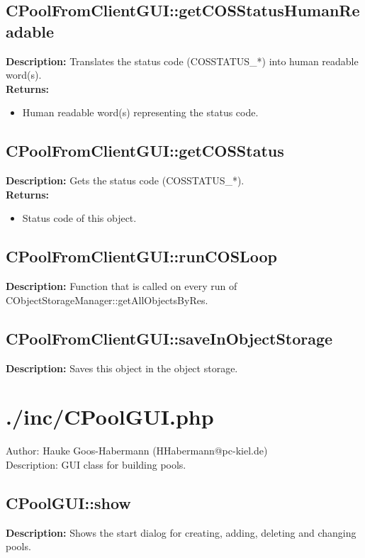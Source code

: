 \subsection{CPoolFromClientGUI::getCOSStatusHumanReadable}
\textbf{Description:} Translates the status code (COSSTATUS\_*) into human readable word(s).\\
\textbf{Returns:}
\begin{itemize}
\item Human readable word(s) representing the status code.
\end{itemize}

\subsection{CPoolFromClientGUI::getCOSStatus}
\textbf{Description:} Gets the status code (COSSTATUS\_*).\\
\textbf{Returns:}
\begin{itemize}
\item Status code of this object.
\end{itemize}

\subsection{CPoolFromClientGUI::runCOSLoop}
\textbf{Description:} Function that is called on every run of CObjectStorageManager::getAllObjectsByRes.\\

\subsection{CPoolFromClientGUI::saveInObjectStorage}
\textbf{Description:} Saves this object in the object storage.\\

\newpage\section{./inc/CPoolGUI.php}
 Author: Hauke Goos-Habermann (HHabermann@pc-kiel.de)\\
 Description: GUI class for building pools.\\

\subsection{CPoolGUI::show}
\textbf{Description:} Shows the start dialog for creating, adding, deleting and changing pools.\\

